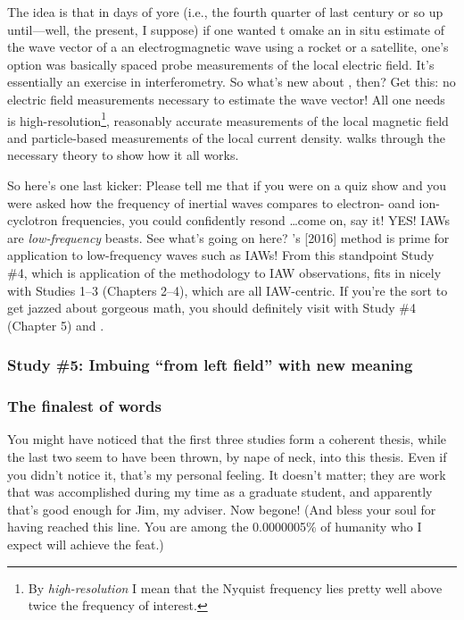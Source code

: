 The idea is that in days of yore (i.e., the fourth quarter of last century or so
up until---well, the present, I suppose) if one wanted t omake an in situ
estimate of the wave vector of a an electrogmagnetic wave using a rocket or a
satellite, one's option was basically spaced probe measurements of the local
electric field. It's essentially an exercise in interferometry. So what's new
about \citet{Bellan2016}, then? Get this: no electric field measurements
necessary to estimate the wave vector! All one needs is
high-resolution\footnote{By \emph{high-resolution} I mean that the Nyquist
  frequency lies pretty well above twice the frequency of interest.}, reasonably
accurate measurements of the local magnetic field and particle-based
measurements of the local current density. \citet{Bellan2016} walks through the
necessary theory to show how it all works.

So here's one last kicker: Please tell me that if you were on a quiz show and
you were asked how the frequency of inertial \Alf waves compares to electron-
oand ion-cyclotron frequencies, you could confidently resond \dots come on, say
it! YES! IAWs are \emph{low-frequency} beasts. See what's going on here?
\citeauthor{Bellan2016}'s [2016] method is prime for application to
low-frequency waves such as IAWs! From this standpoint Study \#4, which is
application of the \citet{Bellan2016} methodology to IAW observations, fits in
nicely with Studies 1--3 (Chapters 2--4), which are all IAW-centric. If you're
the sort to get jazzed about gorgeous math, you should definitely visit with
Study \#4 (Chapter 5) and \citet{Bellan2016}.

\subsubsection{Study \#5: Imbuing ``from left field'' with new meaning}




\subsubsection{The finalest of words }

You might have noticed that the first three studies form a coherent thesis,
while the last two seem to have been thrown, by nape of neck, into this
thesis. Even if you didn't notice it, that's my personal feeling. It doesn't
matter; they are work that was accomplished during my time as a graduate
student, and apparently that's good enough for Jim, my adviser. Now begone!
(And bless your soul for having reached this line. You are among the 0.0000005\%
of humanity who I expect will achieve the feat.)



